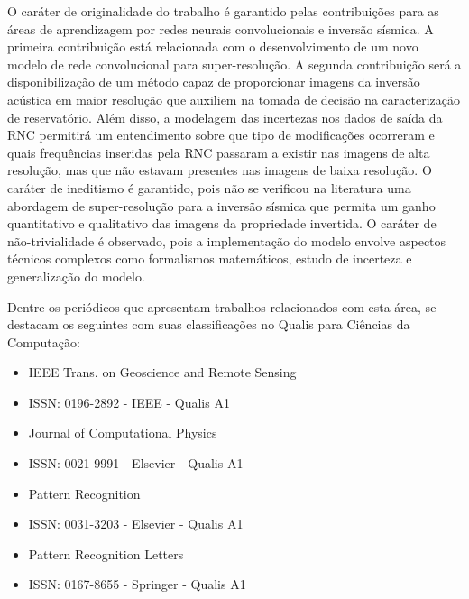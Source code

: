 O caráter de originalidade do trabalho é garantido pelas contribuições para as
áreas de aprendizagem por redes neurais convolucionais e inversão sísmica.
A primeira contribuição está relacionada com o desenvolvimento de um
novo modelo de rede convolucional para super-resolução.
A segunda contribuição será a disponibilização de um método capaz de
proporcionar imagens da inversão acústica em maior resolução que auxiliem
na tomada de decisão na caracterização de reservatório. Além disso, a modelagem
das incertezas nos dados de saída da RNC permitirá um entendimento sobre que tipo de modificações
ocorreram e quais frequências inseridas pela RNC passaram a existir
nas imagens de alta resolução, mas que não estavam presentes nas imagens de baixa resolução.
O caráter de ineditismo é garantido, pois não se verificou na literatura uma
abordagem de super-resolução para a inversão sísmica que permita um
ganho quantitativo e qualitativo das imagens da propriedade invertida.
O caráter de não-trivialidade é observado, pois a implementação do modelo
envolve aspectos técnicos complexos como formalismos matemáticos, estudo
de incerteza e generalização do modelo.

Dentre os periódicos que apresentam trabalhos relacionados com esta área, se
destacam os seguintes com suas classificações no Qualis para Ciências da
Computação:

\begin{itemize}
  \setlength{\itemsep}{0pt}
  \setlength{\parskip}{0pt}
  \item IEEE Trans. on Geoscience and Remote Sensing
  \item ISSN: 0196-2892 - IEEE - Qualis A1
\end{itemize}

\begin{itemize}
  \setlength{\itemsep}{0pt}
  \setlength{\parskip}{0pt}
  \item Journal of Computational Physics
  \item ISSN: 0021-9991 - Elsevier - Qualis A1
\end{itemize}

\begin{itemize}
  \setlength{\itemsep}{0pt}
  \setlength{\parskip}{0pt}
  \item Pattern Recognition
  \item ISSN: 0031-3203 - Elsevier - Qualis A1
\end{itemize}


\begin{itemize}
  \setlength{\itemsep}{0pt}
  \setlength{\parskip}{0pt}
  \item Pattern Recognition Letters
  \item ISSN: 0167-8655 - Springer - Qualis A1
\end{itemize}

